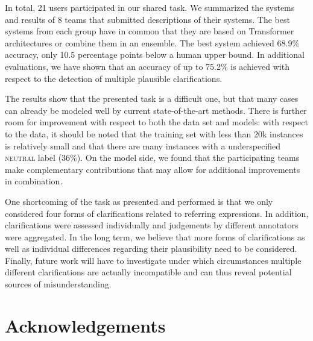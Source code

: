 \documentclass[11pt]{article}
\begin{document}
In total, 21 users participated in our shared task. We summarized the systems and results of 8 teams that submitted descriptions of their systems. The best systems from each group have in common that they are based on Transformer architectures or combine them in an ensemble. The best system achieved 68.9\% accuracy, only 10.5 percentage points below a human upper bound. In additional evaluations, we have shown that an accuracy of up to 75.2\% is achieved with respect to the detection of multiple plausible clarifications.

The results show that the presented task is a difficult one, but that many cases can already be modeled well by current state-of-the-art methods. There is further room for improvement with respect to both the data set and models: with respect to the data, it should be noted that the training set with less than 20k instances is relatively small and that there are many instances with a underspecified \textsc{neutral} label (36\%). On the model side, we found that the participating teams make complementary contributions that may allow for additional improvements in combination.

One shortcoming of the task as presented and performed is that we only considered four forms of clarifications related to referring expressions. In addition, clarifications were assessed individually and judgements by different annotators were aggregated. In the long term, we believe that more forms of clarifications as well as individual differences regarding their plausibility need to be considered. Finally, future work will have to investigate under which circumstances multiple different clarifications are actually incompatible and can thus reveal potential sources of misunderstanding.


\section*{Acknowledgements}
\end{document}
